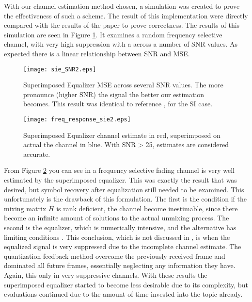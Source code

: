 With our channel estimation method chosen, a simulation was created to prove the effectiveness of such a scheme.  The result of this implementation were directly compared with the results of the paper to prove correctness.  %
The results of this simulation are seen in Figure \ref{sie}.  It examines a random frequency selective channel, with very high suppression with a across a number of SNR values.  As expected there is a linear relationship between SNR and MSE.\\  %

\begin{figure}[!ht]
\centering
\texttt{[image: sie\_SNR2.eps]}
\caption{Superimposed Equalizer MSE across several SNR values.  The more pronounce (higher SNR) the signal the better our estimation becomes.  This result was identical to reference \cite{Ghogho}, for the SI case.}
\label{sie}
\end{figure}

\begin{figure}[!ht]
\centering
\texttt{[image: freq\_response\_sie2.eps]}
\caption{Superimposed Equalizer channel estimate in red, superimposed on actual the channel in blue.  With SNR > 25, estimates are considered accurate.}
\label{fig:sie_freq}
\end{figure}

%

From Figure \ref{fig:sie_freq} you can see in a frequency selective fading channel is very well estimated by the superimposed equalizer.  This was exactly the result that was desired, but symbol recovery after equalization still needed to be examined. This unfortunately is the drawback of this formulation.  The first is the condition if the mixing matrix \(H\) is rank deficient, the channel become inestimable,  since there become an infinite amount of solutions to the actual unmixing process.  The second is the equalizer, which is numerically intensive, and the alternative has limiting conditions \cite{Ghogho}.  This conclusion, which is not discussed in \cite{Ghogho}, is when the equalized signal is very suppressed due to the incomplete channel estimate.  The quantization feedback method overcome the previously received frame and dominated all future frames, essentially neglecting any information they have.  Again, this only in very suppressive channels.  With these results the superimposed equalizer started to become less desirable due to its complexity, but evaluations continued due to the amount of time invested into the topic already.\\

